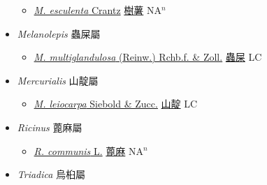 \begin{itemize}
  \begin{itemize}
        \item[] \href{http://www.theplantlist.org/tpl1.1/search?q=Manihot+esculenta}{\textit{M. esculenta} Crantz}   \href{\detokenize{http://taibnet.sinica.edu.tw/chi/taibnet_species_list.php?T2=樹薯&T2_new_value=true&fr=y}}{樹薯} NA$^n$
  \end{itemize}
 \item[] \textit{Melanolepis} 蟲屎屬
                    
  \begin{itemize}
        \item[] \href{http://www.theplantlist.org/tpl1.1/search?q=Melanolepis+multiglandulosa}{\textit{M. multiglandulosa} (Reinw.) Rchb.f. \& Zoll.}   \href{\detokenize{http://taibnet.sinica.edu.tw/chi/taibnet_species_list.php?T2=蟲屎&T2_new_value=true&fr=y}}{蟲屎} LC
  \end{itemize}
 \item[] \textit{Mercurialis} 山靛屬
                    
  \begin{itemize}
        \item[] \href{http://www.theplantlist.org/tpl1.1/search?q=Mercurialis+leiocarpa}{\textit{M. leiocarpa} Siebold \& Zucc.}   \href{\detokenize{http://taibnet.sinica.edu.tw/chi/taibnet_species_list.php?T2=山靛&T2_new_value=true&fr=y}}{山靛} LC
  \end{itemize}
 \item[] \textit{Ricinus} 蓖麻屬
                    
  \begin{itemize}
        \item[] \href{http://www.theplantlist.org/tpl1.1/search?q=Ricinus+communis}{\textit{R. communis} L.}   \href{\detokenize{http://taibnet.sinica.edu.tw/chi/taibnet_species_list.php?T2=蓖麻&T2_new_value=true&fr=y}}{蓖麻} NA$^n$
  \end{itemize}
 \item[] \textit{Triadica} 烏桕屬
                    

\end{itemize}
